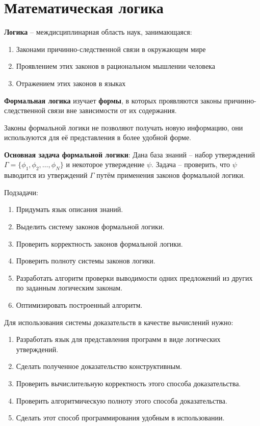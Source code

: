 \documentclass[11pt]{article}
\author{Sergey Makarov}
\date{\today}
\title{}
\begin{document}
\tableofcontents


\section{Математическая логика}
\label{sec:orgd6f7fc0}
\textbf{Логика} -- междисциплинарная область наук, занимающаяся:
\begin{enumerate}
\item Законами причинно-следственной связи в окружающем мире
\item Проявлением этих законов в рациональном мышлении человека
\item Отражением этих законов в языках
\end{enumerate}
\textbf{Формальная логика} изучает \textbf{формы}, в которых проявляются законы причинно-следственной связи вне зависимости от их содержания.

Законы формальной логики не позволяют получать новую информацию, они используются для её представления в более удобной форме.

\textbf{Основная задача формальной логики}:
Дана база знаний -- набор утверждений \(\Gamma = \{\phi_1, \phi_2, \ldots, \phi_N\}\) и некоторое утверждение \(\psi\). Задача -- проверить, что \(\psi\) выводится из утверждений \(\Gamma\) путём применения законов формальной логики.

Подзадачи:
\begin{enumerate}
\item Придумать язык описания знаний.
\item Выделить систему законов формальной логики.
\item Проверить корректность законов формальной логики.
\item Проверить полноту системы законов логики.
\item Разработать алгоритм проверки выводимости одних предложений из других по заданным логическим законам.
\item Оптимизировать построенный алгоритм.
\end{enumerate}

Для использования системы доказательств в качестве вычислений нужно:
\begin{enumerate}
\item Разработать язык для представления программ в виде логических утверждений.
\item Сделать полученное доказательство конструктивным.
\item Проверить вычислительную корректность этого способа доказательства.
\item Проверить алгоритмическую полноту этого способа доказательства.
\item Сделать этот способ программирования удобным в использовании.
\end{enumerate}
\end{document}
